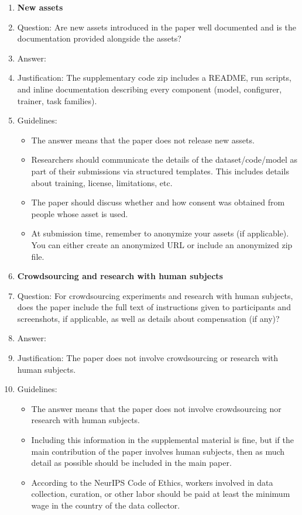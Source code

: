 \begin{enumerate}
\item {\bf New assets}
    \item[] Question: Are new assets introduced in the paper well documented and is the documentation provided alongside the assets?
    \item[] Answer: \answerYes{}
    \item[] Justification: The supplementary code zip includes a README, run scripts, and inline documentation describing every component (model, configurer, trainer, task families).
    \item[] Guidelines:
    \begin{itemize}
        \item The answer \answerNA{} means that the paper does not release new assets.
        \item Researchers should communicate the details of the dataset\slash code\slash model as part of their submissions via structured templates. This includes details about training, license, limitations, etc.
        \item The paper should discuss whether and how consent was obtained from people whose asset is used.
        \item At submission time, remember to anonymize your assets (if applicable). You can either create an anonymized URL or include an anonymized zip file.
    \end{itemize}

\item {\bf Crowdsourcing and research with human subjects}
    \item[] Question: For crowdsourcing experiments and research with human subjects, does the paper include the full text of instructions given to participants and screenshots, if applicable, as well as details about compensation (if any)?
    \item[] Answer: \answerNA{}
    \item[] Justification: The paper does not involve crowdsourcing or research with human subjects.
    \item[] Guidelines:
    \begin{itemize}
        \item The answer \answerNA{} means that the paper does not involve crowdsourcing nor research with human subjects.
        \item Including this information in the supplemental material is fine, but if the main contribution of the paper involves human subjects, then as much detail as possible should be included in the main paper.
        \item According to the NeurIPS Code of Ethics, workers involved in data collection, curation, or other labor should be paid at least the minimum wage in the country of the data collector.
    \end{itemize}


\end{enumerate}
